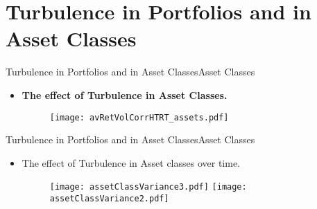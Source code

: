 \documentclass{beamer}
\begin{document}
\section{\small{Turbulence in Portfolios and in Asset Classes}}
\begin{frame}{Turbulence in Portfolios and in Asset Classes}{Asset Classes}
\begin{itemize}
\vspace{-1.77 in}
\item{\textbf{The effect of Turbulence in Asset Classes.}}
\vspace{-0.72 in}
\begin{figure}
	\scalebox{0.68}
	{\hspace*{-0.9in}\texttt{[image: avRetVolCorrHTRT\_assets.pdf]} }
\end{figure}
\vspace*{-6.95in}
\end{itemize}
\end{frame}

\begin{frame}{Turbulence in Portfolios and in Asset Classes}{Asset Classes}
\begin{itemize}
\vspace*{-0in}
\item{The effect of Turbulence in Asset classes over time.}
\begin{figure}
\begin{itemize}
\begin{center}
	\vspace*{-0.2in}
	\hspace*{-0.9in}
	\texttt{[image: assetClassVariance3.pdf]} 
    \texttt{[image: assetClassVariance2.pdf]} 
\end{center}
\end{itemize}
\end{figure}
\end{itemize}
\end{frame}
\end{document}
